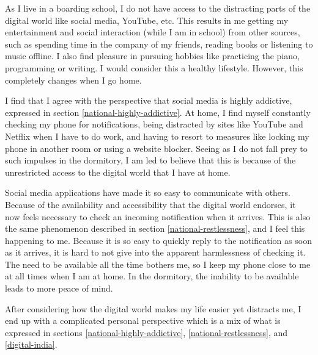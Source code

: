 \documentclass[a4paper, 11pt]{article}
\begin{document}
As I live in a boarding school, I do not have access to the distracting parts of the digital world like social media, YouTube, etc. This results in me getting my entertainment and social interaction (while I am in school) from other sources, such as spending time in the company of my friends, reading books or listening to music offline. I also find pleasure in pursuing hobbies like practicing the piano, programming or writing. I would consider this a healthy lifestyle. However, this completely changes when I go home.

I find that I agree with the perspective that social media is highly addictive, expressed in section \ref{national-highly-addictive}. At home, I find myself constantly checking my phone for notifications, being distracted by sites like YouTube and Netflix when I have to do work, and having to resort to measures like locking my phone in another room or using a website blocker. Seeing as I do not fall prey to such impulses in the dormitory, I am led to believe that this is because of the unrestricted access to the digital world that I have at home.

Social media applications have made it so easy to communicate with others. Because of the availability and accessibility that the digital world endorses, it now feels necessary to check an incoming notification when it arrives. This is also the same phenomenon described in section \ref{national-restlessness}, and I feel this happening to me. Because it is so easy to quickly reply to the notification as soon as it arrives, it is hard to not give into the apparent harmlessness of checking it. The need to be available all the time bothers me, so I keep my phone close to me at all times when I am at home. In the dormitory, the inability to be available leads to more peace of mind.

After considering how the digital world makes my life easier yet distracts me, I end up with a complicated personal perspective which is a mix of what is expressed in sections \ref{national-highly-addictive}, \ref{national-restlessness}, and \ref{digital-india}.
\end{document}
